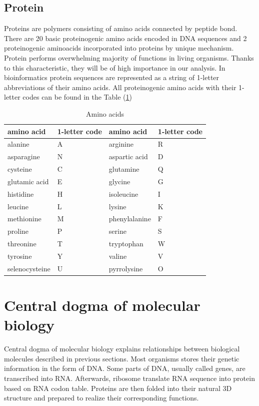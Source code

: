 \subsection{Protein}
Proteins are polymers consisting of amino acids connected by peptide bond.
There are 20 basic proteinogenic amino acids encoded in DNA sequences and 2 proteinogenic aminoacids incorporated into proteins by unique mechanism.
Protein performs overwhelming majority of functions in living organisms.
Thanks to this characteristic, they will be of high importance in our analysis.
In bioinformatics protein sequences are represented as a string of 1-letter abbreviations of their amino acids. All proteinogenic amino acids with their 1-letter codes can be found in the Table (\ref{tab:amino})

\begin{table}
  \centering
    \begin{tabular}{ l  l  l  l }
      \hline
      amino acid & 1-letter code & amino acid & 1-letter code \\
      \hline  
      alanine & A & arginine & R \\
      asparagine & N & aspartic acid & D \\
      cysteine & C & glutamine & Q \\
      glutamic acid & E & glycine & G \\
      histidine & H & isoleucine & I \\
      leucine & L & lysine & K \\
      methionine & M & phenylalanine & F \\
      proline & P & serine & S \\
      threonine & T & tryptophan & W \\
      tyrosine & Y & valine & V \\
      selenocysteine & U & pyrrolysine & O \\
      \hline
    \end{tabular}
    \caption{Amino acids}
    \label{tab:amino}
\end{table}
 


\section{Central dogma of molecular biology}
Central dogma of molecular biology explains relationships between biological molecules described in previous sections.
Most organisms stores their genetic information in the form of DNA.
Some parts of DNA, usually called genes, are transcribed into RNA.
Afterwards, ribosome translate RNA sequence into protein based on RNA codon table.
Proteins are then folded into their natural 3D structure and prepared to realize their corresponding functions.

